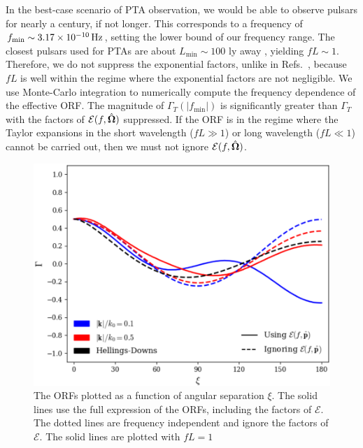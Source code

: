 \documentclass[prd,twocolumn,aps,psfig,nofootinbib,nobibnotes,superscriptaddress,preprintnumbers,times]{revtex4-2}
\newcommand{\Hz}{\,{\rm Hz}}
\begin{document}
In the best-case scenario of PTA observation, we would be able to observe pulsars for nearly a century, if not longer. This corresponds to a frequency of $f_{\text{min}} \sim 3.17 \times 10^{-10} \Hz$, setting the lower bound of our frequency range. The closest pulsars used for PTAs are about $L_{\text{min}} \sim 100$ ly away \cite{Anholm:2008wy}, yielding $fL \sim 1$. Therefore, we do not suppress the exponential factors, unlike in Refs.\ \cite{Liang:2021bct,Arjona:2024cex}, because $fL$ is well within the regime where the exponential factors are not negligible. %
We use Monte-Carlo integration to numerically compute the frequency dependence of the effective ORF. The magnitude of $\Gamma_T(|f_{\text{min}}|)$ is significantly greater than $\Gamma_T$ with the factors of $\mathcal{E}(f, \hat{\bf \Omega})$ suppressed. If the ORF is in the regime where the Taylor expansions in the short wavelength ($fL \gg 1$) or long wavelength ($fL \ll 1$) cannot be carried out, then we must not ignore $\mathcal{E}(f, \hat{\bf \Omega})$.
\begin{figure}[h]
    \centering
    \includegraphics[scale=0.48]{fig1.pdf}
    \caption{The ORFs plotted as a function of angular separation $\xi$. The solid lines use the full expression of the ORFs, including the factors of $\mathcal{E}$. The dotted lines are frequency independent and ignore the factors of $\mathcal{E}$. The solid lines are plotted with $fL = 1$}
    \label{fig:orfs}
\end{figure}
\end{document}
